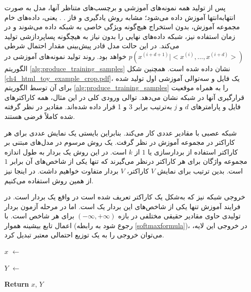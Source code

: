      
     پس از تولید همه نمونه‌های آموزشی و برچسب‌های متناظر آنها، مدل به صورت انتهابه‌انتها  %
     آموزش داده می‌شود؛ مشابه روش یادگیری و فاز
     \cite{Godefroid:2017:LML:3155562.3155573}.
     . یعنی، داده‌های خام مجموعه آموزش، بدون استخراج هیچ‌گونه ویژگی خاصی به شبکه داده می‌شوند و در زمان استفاده نیز، شبکه داده‌های نهایی را بدون نیاز به هیچگونه پسا‌پردازشی تولید می‌کند. در این حالت مدل قادر پیش‌بینی مقدار احتمال شرطی 
     $p(x^{(i+d+1)}| <x^{(i)}, ..., x^{(i+d)}>)$
     خواهد بود. روند تولید نمونه‌های آموزشی در الگوریتم \ref{alg:produce_training_samples} نشان داده شده است. همچنین شکل \ref{ch4_html_toy_example_crop.pdf}، یک فایل  و سه‌توالی آموزشی اول تولید شده برای آن توسط الگوریتم \ref{alg:produce_training_samples} را به همراه موقعیت قرارگیری آنها در شبکه نشان می‌دهد. توالی ورودی کلی در این مثال، همه کاراکترهای فایل  و پارامترهای $d$  و $j$ به‌ترتیب برابر 3 و 1 قرار داده شده‌اند. مقادیر در نظر گرفته شده کاملاً فرضی هستند.

شبکه عصبی با مقادیر عددی کار می‌کند. بنابراین بایستی یک نمایش عددی برای هر کاراکتر در مجموعه آموزش در نظر گرفت. یک روش مرسوم در مدل‌های مبتنی بر کاراکتر استفاده از بردارسازی  یا $1$ از $k$ است. در این روش یک بردار به  طول اندازه مجموعه واژگان برای هر کاراکتر درنظر می‌گیرند که تنها یکی از شاخص‌های آن برابر $1$ است. بدین ترتیب برای نمایش $V$ کاراکتر، $V$ بردار متفاوت خواهیم داشت. در اینجا نیز از همین روش استفاده می‌کنیم. 

خروجی شبکه نیز که به‌شکل یک کاراکتر تعریف شده است در واقع یک بردار  است. در فرایند آموزش تنها یکی از شاخص‌های این بردار یک است. اما در مرحله آزمون بردار تولیدی حاوی مقادیر حقیقی مختلفی در بازه
 $(-\infty, +\infty)$
  برای هر شاخص است. با اعمال تابع بیشینه هموار (رجوع شود به رابطه \ref{softmaxformula})، در خروجی این لایه، می‌توان خروجی را به یک توزیع احتمالی معتبر تبدیل کرد.


\begin{algorithm}%
	\onehalfspacing
	\caption{} \label{alg:produce_training_samples}
	\begin{latin}
		\DontPrintSemicolon
		\setcounter{AlgoLine}{0}
		\LinesNumbered
		

		
		
		
		\BlankLine
		
		$x$ $\gets$	\List{} \; 
		
		$Y$ $\gets$ \List{} \;
		
	\textbf{Return}	$x$, $Y$

	\end{latin}
\end{algorithm}


